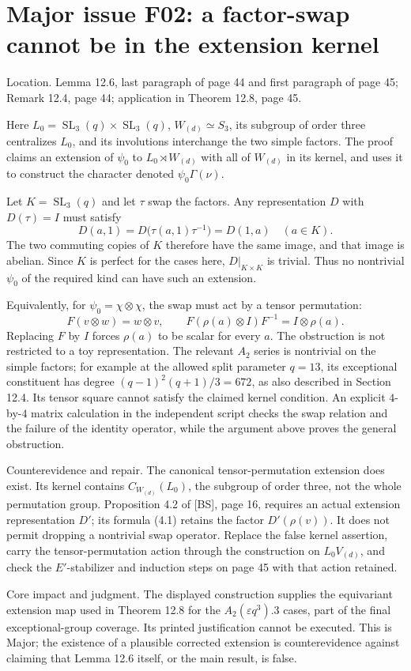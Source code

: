\documentclass[10pt]{article}
\begin{document}
\section*{Major issue F02: a factor-swap cannot be in the extension kernel}
Location. Lemma 12.6, last paragraph of page 44 and first paragraph of page 45; Remark 12.4, page 44; application in Theorem 12.8, page 45.\par
Here \(L_0=\operatorname{SL}_3(q)\times\operatorname{SL}_3(q)\), \(W_{(d)}\simeq S_3\), its subgroup of order three centralizes \(L_0\), and its involutions interchange the two simple factors. The proof claims an extension of \(\psi_0\) to \(L_0\rtimes W_{(d)}\) with all of \(W_{(d)}\) in its kernel, and uses it to construct the character denoted \(\psi_0\Gamma(\nu)\).\par
Let \(K=\operatorname{SL}_3(q)\) and let \(\tau\) swap the factors. Any representation \(D\) with \(D(\tau)=I\) must satisfy \[D(a,1)=D\bigl(\tau(a,1)\tau^{-1}\bigr)=D(1,a)\quad(a\in K).\] The two commuting copies of \(K\) therefore have the same image, and that image is abelian. Since \(K\) is perfect for the cases here, \(D|_{K\times K}\) is trivial. Thus no nontrivial \(\psi_0\) of the required kind can have such an extension.\par
Equivalently, for \(\psi_0=\chi\otimes\chi\), the swap must act by a tensor permutation: \[F(v\otimes w)=w\otimes v,\qquad
 F(\rho(a)\otimes I)F^{-1}=I\otimes\rho(a).\] Replacing \(F\) by \(I\) forces \(\rho(a)\) to be scalar for every \(a\). The obstruction is not restricted to a toy representation. The relevant \(A_2\) series is nontrivial on the simple factors; for example at the allowed split parameter \(q=13\), its exceptional constituent has degree \((q-1)^2(q+1)/3=672\), as also described in Section 12.4. Its tensor square cannot satisfy the claimed kernel condition. An explicit \(4\)-by-\(4\) matrix calculation in the independent script checks the swap relation and the failure of the identity operator, while the argument above proves the general obstruction.\par
Counterevidence and repair. The canonical tensor-permutation extension does exist. Its kernel contains \(C_{W_{(d)}}(L_0)\), the subgroup of order three, not the whole permutation group. Proposition 4.2 of [BS], page 16, requires an actual extension representation \(D'\); its formula (4.1) retains the factor \(D'(\rho(v))\). It does not permit dropping a nontrivial swap operator. Replace the false kernel assertion, carry the tensor-permutation action through the construction on \(L_0V_{(d)}\), and check the \(E'\)-stabilizer and induction steps on page 45 with that action retained.\par
Core impact and judgment. The displayed construction supplies the equivariant extension map used in Theorem 12.8 for the \(A_2(\varepsilon q^3).3\) cases, part of the final exceptional-group coverage. Its printed justification cannot be executed. This is Major; the existence of a plausible corrected extension is counterevidence against claiming that Lemma 12.6 itself, or the main result, is false.\par
\end{document}
